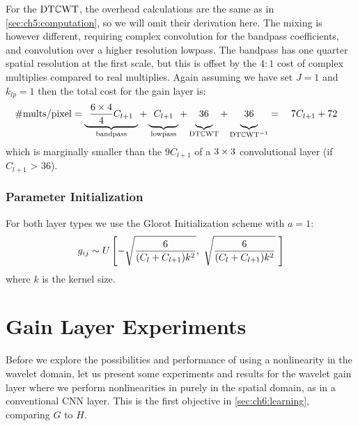 For the $\mathrm{DT}\mathbb{C}\mathrm{WT}$, the overhead calculations are the same as in
\autoref{sec:ch5:computation}, so we will omit their derivation here. The mixing
is however different, requiring complex convolution for the bandpass
coefficients, and convolution over a higher resolution lowpass. The bandpass has
one quarter spatial resolution at the first scale, but this is offset by the
$4:1$ cost of complex multiplies compared to real multiplies. Again assuming we
have set $J=1$ and $k_{lp} = 1$ then the total cost for the gain layer is:
%
\begin{equation}
  \text{\#mults/pixel} = \underbrace{\hphantom{1} \frac{6\x 4}{4}C_{l+1} \hphantom{1}}_{\textrm{bandpass}} +
  \underbrace{\hphantom{1}\vphantom{\frac{6}{4}} C_{l+1} \hphantom{1}}_{\textrm{lowpass}} + 
  \underbrace{\vphantom{\frac{6}{4}} 36}_{\DTCWT} + 
  \underbrace{\vphantom{\frac{6}{4}} 36}_{\DTCWT^{-1}} = \quad 7C_{l+1} + 72 \quad
  \label{eq:ch6:comp_dtcwt}
\end{equation}
which is marginally smaller than the $9C_{l+1}$ of a $3\times 3$ convolutional layer (if $C_{l+1}$ > 36).

\subsubsection{Parameter Initialization}
For both layer types we use the Glorot Initialization scheme \cite{glorot_understanding_2010}
with $a=1$: 
%
\begin{equation}
  g_{ij} \sim U\left[ -\sqrt{\frac{6}{(C_l + C_{l+1})k^2}},\ \sqrt{\frac{6}{(C_l + C_{l+1})k^2}}\
  \right] \label{eq:ch6:glorot}
\end{equation}
where $k$ is the kernel size.

\section{Gain Layer Experiments}\label{sec:ch6:gainlayer_experiments}
Before we explore the possibilities and performance of using a
nonlinearity in the wavelet domain, let us present some experiments and results
for the wavelet gain layer where we perform nonlinearities in purely in the
spatial domain, as in a conventional CNN layer. This is the first objective in
\autoref{sec:ch6:learning}, comparing $G$ to $H$.

